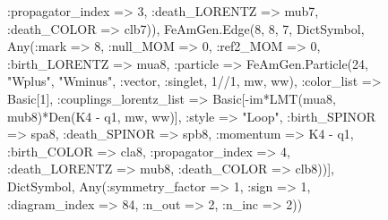 \documentclass{revtex4}
\begin{document}
\begin{figure}[!htb]
\begin{center}
{:propagator_index => 3, :death_LORENTZ => mub7, :death_COLOR => clb7)), FeAmGen.Edge(8, 8, 7, Dict{Symbol, Any}(:mark => 8, :null_MOM => 0, :ref2_MOM => 0, :birth_LORENTZ => mua8, :particle => FeAmGen.Particle(24, "Wplus", "Wminus", :vector, :singlet, 1//1, mw, ww), :color_list => Basic[1], :couplings_lorentz_list => Basic[-im*LMT(mua8, mub8)*Den(K4 - q1, mw, ww)], :style => "Loop", :birth_SPINOR => spa8, :death_SPINOR => spb8, :momentum => K4 - q1, :birth_COLOR => cla8, :propagator_index => 4, :death_LORENTZ => mub8, :death_COLOR => clb8))], Dict{Symbol, Any}(:symmetry_factor => 1, :sign => 1, :diagram_index => 84, :n_out => 2, :n_inc => 2)) 
}
\end{center}
\end{figure}
\end{document}

